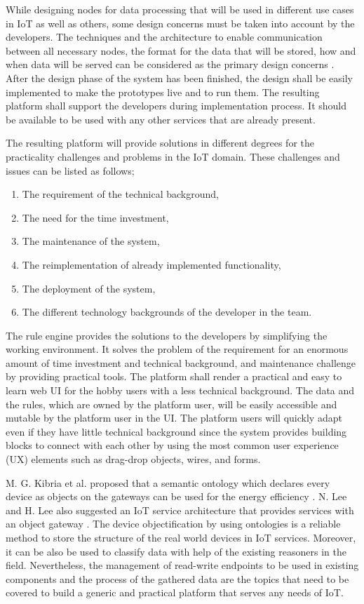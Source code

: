 While designing nodes for data processing that will be used in different use cases in IoT as well as others, some design concerns must be taken into account by the developers. The techniques and the architecture to enable communication between all necessary nodes, the format for the data that will be stored, how and when data will be served can be considered as the primary design concerns \cite{6651222}. After the design phase of the system has been finished, the design shall be easily implemented to make the prototypes live and to run them. The resulting platform shall support the developers during implementation process. It should be available to be used with any other services that are already present.

The resulting platform will provide solutions in different degrees for the practicality challenges and problems in the IoT domain. These challenges and issues can be listed as follows;

\begin{enumerate}
    \item The requirement of the technical background,
    \item The need for the time investment,
    \item The maintenance of the system,
    \item The reimplementation of already implemented functionality,
    \item The deployment of the system,
    \item The different technology backgrounds of the developer in the team.
\end{enumerate}

The rule engine provides the solutions to the developers by simplifying the working environment. It solves the problem of the requirement for an enormous amount of time investment and technical background, and maintenance challenge by providing practical tools. The platform shall render a practical and easy to learn web UI for the hobby users with a less technical background. The data and the rules, which are owned by the platform user, will be easily accessible and mutable by the platform user in the UI. The platform users will quickly adapt even if they have little technical background since the system provides building blocks to connect with each other by using the most common user experience (UX) elements such as drag-drop objects, wires, and forms. 

 M. G. Kibria et al. proposed that a semantic ontology which declares every device as objects on the gateways can be used for the energy efficiency \cite{7993747}. N. Lee and H. Lee also suggested an IoT service architecture that provides services with an object gateway \cite{6884496}. The device objectification by using ontologies is a reliable method to store the structure of the real world devices in IoT services. Moreover, it can be also be used to classify data with help of the existing reasoners in the field. Nevertheless, the management of read-write endpoints to be used in existing components and the process of the gathered data are the topics that need to be covered to build a generic and practical platform that serves any needs of IoT.

